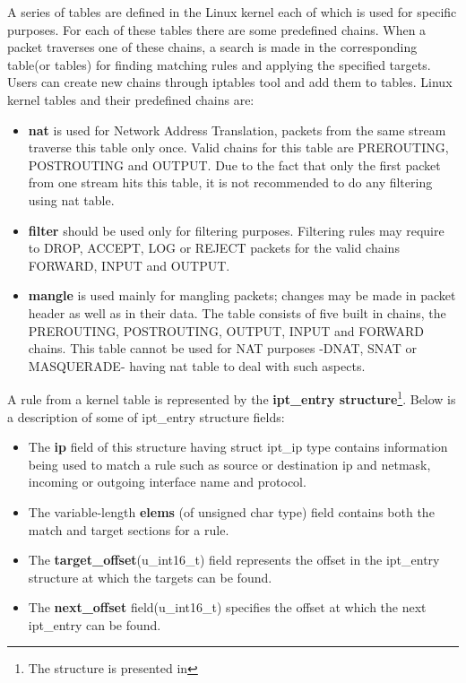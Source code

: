 {{A series of tables are defined in the Linux kernel each of which is used for specific purposes. For each of 
these tables there are some predefined chains. When a packet traverses one of these chains, a search is made 
in the corresponding table(or tables) for finding matching rules and applying the specified targets. Users can 
create new chains through iptables tool and add them to tables.
Linux kernel tables and their predefined chains are:       
\begin{itemize}
\item {\bf nat} is used for Network Address Translation, packets from the same stream traverse this table only 
once. Valid chains for this table are PREROUTING, POSTROUTING and OUTPUT. Due to the fact that only the first 
packet from one stream hits this table, it is not recommended to do any filtering using nat table.
\item {\bf filter} should be used only for filtering purposes. Filtering rules may require to DROP, ACCEPT, LOG or 
REJECT packets for the valid chains FORWARD, INPUT and OUTPUT.
\item {\bf mangle} is used mainly for mangling packets; changes may be made in packet header as well as in their data. 
The table consists of five built in chains, the PREROUTING, POSTROUTING, OUTPUT, INPUT and FORWARD chains. This table cannot 
be used for NAT purposes -DNAT, SNAT or MASQUERADE- having nat table to deal with such aspects. 
\end{itemize}

A rule from a kernel table is represented by the \textbf{ipt_entry structure}\footnote{The structure is presented in }. 
Below is a description of some of ipt_entry structure fields:
\begin{itemize}
\item The \textbf{ip} field of this structure having struct ipt_ip type contains information being used to match a rule such as source or destination ip and netmask, incoming or outgoing interface name and protocol. \item The variable-length \textbf{elems} (of unsigned char type) field contains both the match and target sections for a rule. 
\item The \textbf{target_offset}(u_int16_t) field represents the offset in the ipt_entry structure at which the targets can be found. 
\item The \textbf{next_offset} field(u_int16_t) specifies the offset at which the next ipt_entry can be found.   
\end{itemize}

}}
